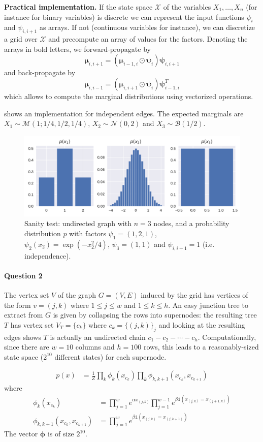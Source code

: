 \documentclass[11pt]{article}
\newcommand{\calM}{\mathcal{M}}
\newcommand{\calN}{\mathcal{N}}
\newcommand{\calX}{\mathcal{X}}
\newcommand{\bmmu}{\boldsymbol{\mu}}
\newcommand{\bmpsi}{\boldsymbol{\psi}}
\newcommand{\bmphi}{\boldsymbol{\phi}}
\begin{document}
\textbf{Practical implementation.} If the state space $\calX$ of the variables $X_1,\ldots,X_n$ (for instance for binary variables) is discrete we can represent the input functions $\psi_i$ and $\psi_{i,i+1}$ as arrays. If not (continuous variables for instance), we can discretize a grid over $\calX$ and precompute an array of values for the factors.
Denoting the arrays in bold letters, we forward-propagate by
\[
	\bmmu_{i, i+1} =
	(\bmmu_{i-1, i} \odot \bmpsi_i)\bmpsi_{i,i+1}
\]
and back-propagate by
\[
	\bmmu_{i,i-1} = (\bmmu_{i,i+1} \odot \bmpsi_i) \bmpsi_{i-1,i}^T
\]
which allows to compute the marginal distributions using vectorized operations.

 shows an implementation for independent edges. The expected marginals are $X_1 \sim \calM(1;1/4,1/2,1/4)$, $X_2\sim \calN(0,2)$ and $X_3 \sim \mathcal{B}(1/2)$.

\begin{figure}
	\centering
	\includegraphics[width=.9\linewidth]{images/graphs/independent_undirected_chain.pdf}
	\caption{Sanity test: undirected graph with $n=3$ nodes, and a probability distribution $p$ with factors $\psi_1 = (1, 2, 1)$, $\psi_2(x_2) = \exp(-x_2^2/4)$, $\psi_3 = (1,1)$ and $\psi_{i,i+1} = 1$ (i.e. independence).}\label{fig:IndependentNodeUGM}
\end{figure}



\paragraph{Question 2} The vertex set $V$ of the graph $G = (V,E)$ induced by the grid has vertices of the form $v = (j,k)$ where $1\leq j \leq w$ and $1 \leq k \leq h$. An easy junction tree to extract from $G$ is given by collapsing the rows into supernodes: the resulting tree $T$ has vertex set $V_T = \{c_k\}$ where $c_k = \{(j,k)\}_j$ and looking at the resulting edges shows $T$ is actually an undirected chain $c_1-c_2 -\cdots-c_h$. Computationally, since there are $w=10$ columns and $h=100$ rows, this leads to a reasonably-sized state space ($2^{10}$ different states) for each supernode.

\begin{align*}
	p(x) &= \frac{1}{Z}\prod_k
	\phi_k(x_{c_k})
	\prod_k
	\phi_{k,k+1}(x_{c_k},x_{c_{k+1}})
\end{align*}
where 
\begin{align*}
	\phi_k(x_{c_k}) &= \prod_{j=1}^w e^{\alpha x_{(j,k)}}
	\prod_{j=1}^{w-1} e^{
		\beta \mathds{1}(
			x_{(j,k)}=x_{(j+1,k)}
		)
	}  \\
	\phi_{k,k+1}(x_{c_k}, x_{c_{k+1}}) &=
	\prod_{j=1}^w e^{
		\beta \mathds{1}(
			x_{(j,k)}=x_{(j,k+1)}
		)
	}
\end{align*}
The vector $\bmphi$ is of size $2^{10}$.
\end{document}
